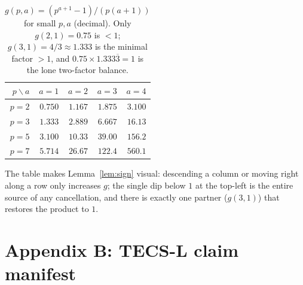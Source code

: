 \documentclass[11pt,a4paper]{article}
\theoremstyle{plain}
\theoremstyle{definition}
\begin{document}
\begin{table}[h]
\centering
\caption{$g(p,a)=(p^{a+1}-1)/(p(a+1))$ for small $p,a$ (decimal). Only
$g(2,1)=0.75$ is $<1$; $g(3,1)=4/3\approx1.333$ is the minimal factor $>1$, and
$0.75\times1.333\overline{3}=1$ is the lone two-factor balance.}
\label{tab:g}
\begin{tabular}{r rrrr}
\toprule
$p\backslash a$ & $a=1$ & $a=2$ & $a=3$ & $a=4$\\
\midrule
$p=2$ & $\boxed{0.750}$ & $1.167$ & $1.875$ & $3.100$\\
$p=3$ & $1.333$ & $2.889$ & $6.667$ & $16.13$\\
$p=5$ & $3.100$ & $10.33$ & $39.00$ & $156.2$\\
$p=7$ & $5.714$ & $26.67$ & $122.4$ & $560.1$\\
\bottomrule
\end{tabular}
\end{table}

The table makes Lemma~\ref{lem:sign} visual: descending a column or moving
right along a row only increases $g$; the single dip below $1$ at the top-left
is the entire source of any cancellation, and there is exactly one partner
($g(3,1)$) that restores the product to $1$.

\section{Appendix B: TECS-L claim manifest}
\label{sec:manifest}
\end{document}
